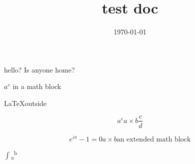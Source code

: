 \documentclass[11pt]{article}
\date{\today}
\title{test doc}
\begin{document}
\maketitle
\tableofcontents

hello? Is anyone home?

\(a^e\) in a math block

\LaTeX outside

\[ a^e a \times b \frac{c}{d} \]

\[
e^{i \pi} -1 = 0
a \times b
\text{an extended math block}
\]


\begin{latex}
\(\int\)\textsubscript{a}\textsuperscript{b} 
\end{latex}
\end{document}
